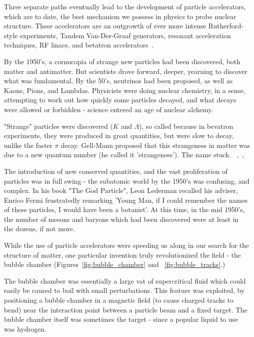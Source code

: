 Three separate paths eventually lead to the development of particle
accelerators, which are to date, the best mechanism we possess in physics to
probe nuclear structure. These accelerators are an outgrowth
of ever more intense Rutherford-style experiments, Tandem Van-Der-Graaf
generators, resonant acceleration techniques, RF linacs, and betatron
accelerators~\cite{Bryant1994}.

By the 1950's, a cornucopia of strange new particles had been discovered, both
matter and antimatter. But scientists drove forward, deeper, yearning to
discover what was fundamental. By the 50's, neutrinos had been proposed, as well
as Kaons, Pions, and Lambdas. Physicists were doing nuclear chemistry, in a
sense, attempting to work out how quickly some particles decayed, and what
decays were allowed or forbidden - science entered an age of nuclear alchemy.

"Strange" particles were discovered ($K$ and $\Lambda$), so called because in
bevatron experiments, they were produced in great quantities, but were slow to
decay, unlike the faster $\pi$ decay. Gell-Mann proposed that this strangeness
in matter was due to a new quantum number (he called it 'strangeness'). The name
stuck.
~\cite{Gell-Mann1953},~\cite{Gell-Mann1956},~\cite{Krauss2015}

The introduction of new conserved quantities, and the vast proliferation of
particles was in full swing - the subatomic world by the 1950's was confusing,
and complex. In his book "The God Particle", Leon Lederman recalled his adviser,
Enrico Fermi frustratedly remarking 'Young Man, if I could remember the names of
these particles, I would have been a botanist'. At this time, in the mid 1950's,
the number of mesons and baryons which had been discovered were at least in the
dozens, if not more.

While the use of particle accelerators were speeding us along in  our search for
the structure of matter, one particular invention truly revolutionized the
field - the bubble chamber (Figures~\ref{fig:bubble_chamber} and
~\ref{fig:bubble_tracks}.)

The bubble chamber was essentially a large vat of supercritical fluid which
could easily be caused to boil with small perturbations. This feature was
exploited, by positioning a bubble chamber in a magnetic field (to cause charged
tracks to bend) near the interaction point between a particle beam and a fixed
target. The bubble chamber itself was sometimes the target - since a popular
liquid to use was hydrogen. 

